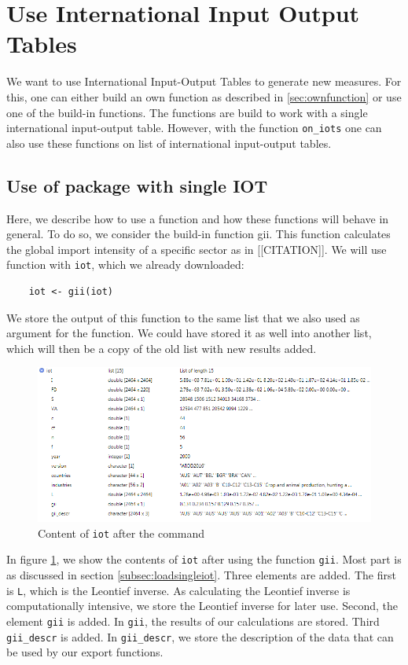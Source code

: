 \documentclass[10pt,a4paper]{paper}
\begin{document}
	
	\section{Use International Input Output Tables}
	We want to use International Input-Output Tables to generate new measures. For this, one can either build an own function as described in \ref{sec:ownfunction} or use one of the build-in functions. The functions are build to work with a single international input-output table. However, with the function \texttt{on\_iots} one can also use these functions on list of international input-output tables.
	
	\subsection{Use of package with single IOT}
	Here, we describe how to use a function and how these functions will behave in general. To do so, we consider the build-in function gii. This function  calculates the global import intensity of a specific sector as in [[CITATION]]. We will use function with \texttt{iot}, which we already downloaded:
	\begin{Verbatim}
	iot <- gii(iot)
	\end{Verbatim}
	We store the output of this function to the same list that we also used as argument for the function. We could have stored it as well into another list, which will then be a copy of the old list with new results added.
	
	\begin{figure}
	\centering
	\includegraphics[width=1\linewidth]{content_iot_function}
	\caption{Content of \texttt{iot} after the command}
	\label{fig:contentiotfunction}
	\end{figure}

	In figure \ref{fig:contentiotfunction}, we show the contents of \texttt{iot} after using the function \texttt{gii}. Most part is as discussed in section \ref{subsec:loadsingleiot}. Three elements are added. The first is \texttt{L}, which is the Leontief inverse. As calculating the Leontief inverse is computationally intensive, we store the Leontief inverse for later use. Second, the element \texttt{gii} is added. In \texttt{gii}, the results of our calculations are stored. Third \texttt{gii\_descr} is added. In \texttt{gii\_descr}, we store the description of the data that can be used by our export functions.
	
\end{document}

